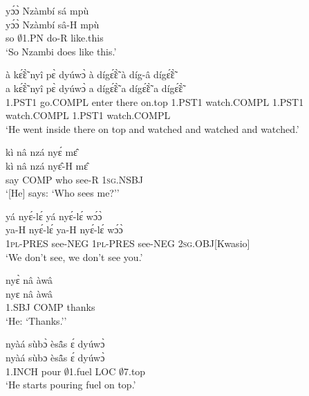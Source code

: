\begin{exe} 
\exN\label{162}
  \glll yɔ́ɔ̀ Nzàmbí sá mpù \\ 
        yɔ́ɔ̀ Nzàmbí sâ-H mpù \\
        so $\emptyset$1.PN do-R like.this \\
    \trans `So Nzambi does like this.'
\end{exe}

\begin{exe} 
\exN\label{163} 
  \glll à kɛ̃́ɛ̃̀ nyî pɛ̀ dyúwɔ̀ à dígɛ̃́ɛ̃̀ à díg-â dígɛ̃́ɛ̃̀\\
        a kɛ̃́ɛ̃̀ nyî pɛ̀ dyúwɔ̀ a dígɛ̃́ɛ̃̀ a dígɛ̃́ɛ̃̀ a dígɛ̃́ɛ̃̀\\
       1.PST1 go.COMPL enter there on.top 1.PST1 watch.COMPL 1.PST1 watch.COMPL 1.PST1 watch.COMPL\\
    \trans `He went inside there on top and watched and watched and watched.'
\end{exe}

\begin{exe} 
\exN\label{164}
  \glll kì nâ nzá nyɛ́ mɛ̂ \\
      kì nâ nzá nyɛ̂-H mɛ̂ \\
       say COMP who see-R 1\textsc{sg}.NSBJ  \\
    \trans `[He] says: `Who sees me?''
\end{exe}

\begin{exe} 
\exN\label{165}
  \glll yá nyɛ́-lɛ́ yá nyɛ́-lɛ́ wɔ́ɔ̀ \\
    ya-H nyɛ́-lɛ́ ya-H nyɛ́-lɛ́ wɔ́ɔ̀ \\
         1\textsc{pl}-PRES see-NEG 1\textsc{pl}-PRES see-NEG 2\textsc{sg}.OBJ[Kwasio] \\
    \trans `We don't see, we don't see you.'
\end{exe}

\begin{exe} 
\exN\label{166}
  \glll nyɛ̀ nâ àwâ \\
     nyɛ nâ àwâ \\
       1.SBJ COMP thanks  \\
    \trans `He: `Thanks.''
\end{exe}

\begin{exe} 
\exN\label{167}
  \glll nyàá sùbɔ̀ èsã̂s ɛ́ dyúwɔ̀ \\
        nyàá sùbɔ èsã̂s ɛ́ dyúwɔ̀ \\
       1.INCH pour $\emptyset$1.fuel LOC $\emptyset$7.top  \\
    \trans `He starts pouring fuel on top.'
\end{exe}

